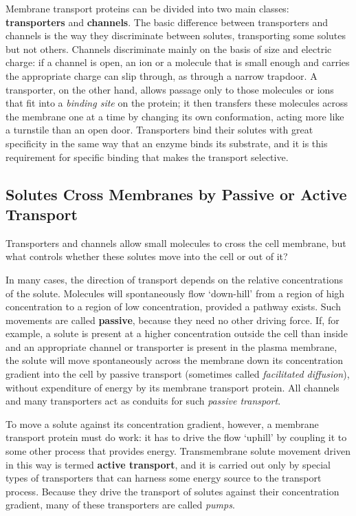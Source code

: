Membrane transport proteins can be divided into two main classes:
\textbf{transporters} and \textbf{channels}. The basic difference between transporters
and channels is the way they discriminate between solutes, transporting
some solutes but not others. Channels discriminate mainly
on the basis of size and electric charge: if a channel is open, an ion or a
molecule that is small enough and carries the appropriate charge can slip
through, as through a narrow trapdoor. A transporter, on the other hand,
allows passage only to those molecules or ions that fit into a \textit{binding
site} on the protein; it then transfers these molecules across the membrane
one at a time by changing its own conformation, acting more like
a turnstile than an open door. Transporters bind their solutes with great
specificity in the same way that an enzyme binds its substrate, and it is
this requirement for specific binding that makes the transport selective.

\subsection{Solutes Cross Membranes by Passive or Active Transport}

Transporters and channels allow small molecules to cross the cell membrane,
but what controls whether these solutes move into the cell or out
of it? 

In many cases, the direction of transport depends on the relative
concentrations of the solute. Molecules will spontaneously flow ‘down-hill’
from a region of high concentration to a region of low concentration,
provided a pathway exists. Such movements are called \textbf{passive}, because
they need no other driving force. If, for example, a solute is present at
a higher concentration outside the cell than inside and an appropriate
channel or transporter is present in the plasma membrane, the solute
will move spontaneously across the membrane down its concentration
gradient into the cell by passive transport (sometimes called \textit{facilitated
diffusion}), without expenditure of energy by its membrane transport protein.
All channels and many transporters act as conduits for such \textit{passive
transport}.

To move a solute against its concentration gradient, however, a membrane
transport protein must do work: it has to drive the flow ‘uphill’
by coupling it to some other process that provides energy. Transmembrane solute movement
driven in this way is termed \textbf{active transport}, and it is carried out only
by special types of transporters that can harness some energy source to
the transport process. Because they drive the transport of
solutes against their concentration gradient, many of these transporters
are called \textit{pumps}.

